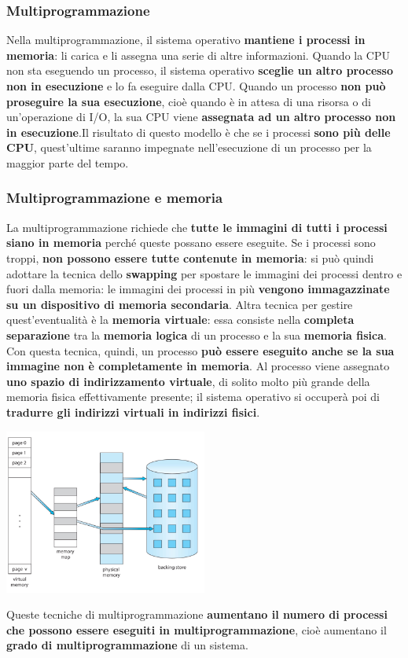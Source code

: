 \documentclass[12pt]{article}
\begin{document}
\subsubsection{Multiprogrammazione}
Nella multiprogrammazione, il sistema operativo \textbf{mantiene i processi in memoria}: li carica e li assegna una serie di altre informazioni. Quando la CPU non sta eseguendo un processo, il sistema operativo \textbf{sceglie un altro processo non in esecuzione} e lo fa eseguire dalla CPU. Quando un processo \textbf{non può proseguire la sua esecuzione}, cioè quando è in attesa di una risorsa o di un'operazione di I/O, la sua CPU viene \textbf{assegnata ad un altro processo non in esecuzione}.Il risultato di questo modello è che se i processi \textbf{sono più delle CPU}, quest'ultime saranno impegnate nell'esecuzione di un processo per la maggior parte del tempo.
\subsubsection{Multiprogrammazione e memoria}
La multiprogrammazione richiede che \textbf{tutte le immagini di tutti i processi siano in memoria} perché queste possano essere eseguite. Se i processi sono troppi, \textbf{non possono essere tutte contenute in memoria}: si può quindi adottare la tecnica dello \textbf{swapping} per spostare le immagini dei processi dentro e fuori dalla memoria: le immagini dei processi in più \textbf{vengono immagazzinate su un dispositivo di memoria secondaria}. \newline
Altra tecnica per gestire quest'eventualità è la \textbf{memoria virtuale}: essa consiste nella \textbf{completa separazione} tra la \textbf{memoria logica} di un processo e la sua \textbf{memoria fisica}. Con questa tecnica, quindi, un processo \textbf{può essere eseguito anche se la sua immagine non è completamente in memoria}. Al processo viene assegnato \textbf{uno spazio di indirizzamento virtuale}, di solito molto più grande della memoria fisica effettivamente presente; il sistema operativo si occuperà poi di \textbf{tradurre gli indirizzi virtuali in indirizzi fisici}.
\begin{center}
    \includegraphics[width = 0.50\textwidth]{Images/51.PNG}
\end{center}
Queste tecniche di multiprogrammazione \textbf{aumentano il numero di processi che possono essere eseguiti in multiprogrammazione}, cioè aumentano il \textbf{grado di multiprogrammazione} di un sistema.
\end{document}
